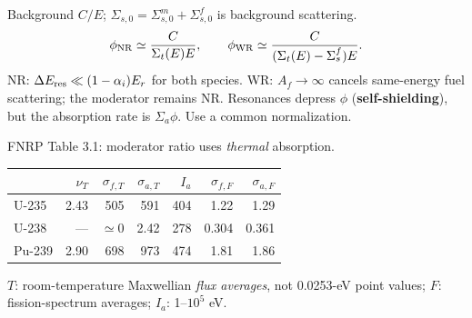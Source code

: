 \begin{handoutcolumns}
 Background $C/E$;
$\Sigma_{s,0}=\Sigma_{s,0}^m+\Sigma_{s,0}^f$ is background scattering.
\[
 \phi_{\rm NR}\simeq\frac{C}{\Sigma_t(E) E},\qquad
 \phi_{\rm WR}\simeq\frac{C}{(\Sigma_t(E)-\Sigma_s^f)E}.
\]
NR: $\Delta E_{\rm res}\ll(1-\alpha_i)E_r$ for both species.
WR: $A_f\to\infty$ cancels same-energy fuel scattering; the moderator
remains NR. Resonances depress $\phi$ (\textbf{self-shielding}), but the
absorption rate is $\Sigma_a\phi$. Use a common normalization.


\par{}\vspace{2pt}

\par{}\vspace{2pt}
FNRP Table 3.1: moderator ratio uses \emph{thermal} absorption.

\par\vspace{2pt}
{\centering\fontsize{8}{9.2}\selectfont
\begin{tabular}{@{}lrrrrrr@{}}
\toprule
 & $\nu_T$ & $\sigma_{f,T}$ & $\sigma_{a,T}$ & $I_a$ & $\sigma_{f,F}$ & $\sigma_{a,F}$\\
\midrule
U-235 & 2.43 & 505 & 591 & 404 & 1.22 & 1.29\\
U-238 & --- & $\simeq0$ & 2.42 & 278 & 0.304 & 0.361\\
Pu-239 & 2.90 & 698 & 973 & 474 & 1.81 & 1.86\\
\bottomrule
\end{tabular}\par}
$T$: room-temperature Maxwellian \emph{flux averages}, not 0.0253-eV
point values; $F$: fission-spectrum averages; $I_a$: 1--$10^5$ eV.


\end{handoutcolumns}
